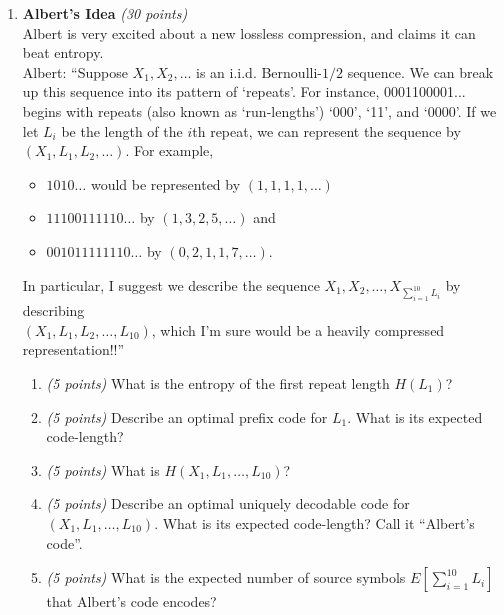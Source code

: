 \documentclass[12pt]{article}
\begin{document}
\begin{enumerate}
\item  {\bf Albert's Idea} {\it (30 points)}\\
Albert is very excited about a new lossless compression, and claims it can beat entropy.\\

Albert: ``Suppose $X_1,X_2,\ldots$ is an  i.i.d. Bernoulli-$1/2$ sequence.
We can break up this sequence into its pattern of `repeats'.  For instance,
0001100001... begins with repeats (also known as `run-lengths')  `000', `11', and `0000'. If we let $L_i$ be
the length of the $i$th repeat, we can represent the sequence 
by  $(X_1, L_1, L_2, \ldots )$. For example, 
\begin{itemize}
	\item $1010\ldots$ would be represented by $(1,1,1,1, \ldots)$
	\item $11100111110\ldots$ by $(1,3,2,5, \ldots)$ and 
	\item $001011111110\ldots$ by $(0,2,1,1,7, \ldots)$. 
\end{itemize}
In particular, I suggest we  describe the sequence $X_1, X_2, \ldots, X_{\sum_{i=1}^{10} L_i}$ by describing\\
 $(X_1, L_1, L_2,\ldots,L_{10})$, which I'm sure would be a heavily compressed representation!!''

\begin{enumerate}
\item {\it (5 points)} What is the entropy of the first repeat length $H(L_1)$?

\item {\it (5 points)} Describe an optimal prefix code for $L_1$. What is its expected code-length?  


\item {\it (5 points)} What is $H(X_1,L_1,\ldots,L_{10})$?

\item {\it (5 points)} Describe an optimal  uniquely decodable code for $(X_1,L_1,\ldots,L_{10})$.   What is its expected code-length?  
Call it ``Albert's code''. 

\item {\it (5 points)} What is the expected number of source symbols $E[\sum_{i=1}^{10} L_i]$ that Albert's code encodes?


\end{enumerate}
\end{enumerate}
\end{document}
